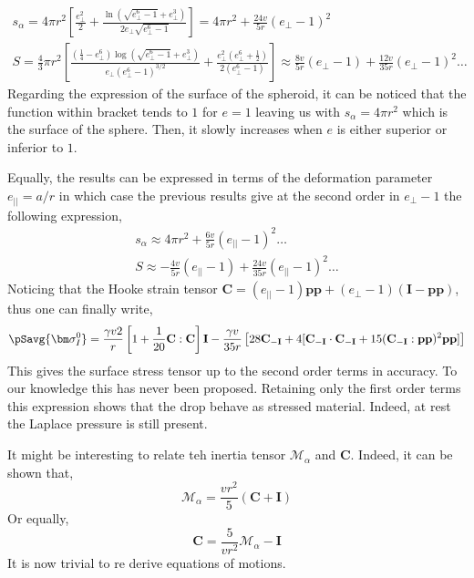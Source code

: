 \begin{align*}
    s_\alpha 
    = 4\pi r^2 \left[\frac{e_\bot^2}{2} + \frac{\ln\left(\sqrt{{e_\bot^6}-1}+{e_\bot^3}\right)}{2e_\bot\sqrt{e_\bot^6-1}}\right]
    = 4 \pi r^2 + \frac{24 v }{5 r} (e_\bot-1)^2\\
    S = \frac{4}{3} \pi r^2 \left[
    \frac{\left( \frac{1}{4} - e_\bot^6\right)  \log{\left( \sqrt{e_\bot^6-1}+{e_\bot^3}\right) } }
    { e_\bot  \left( e_\bot^6- 1\right)^{3/2} }
    +  \frac{e_\bot^2\left( e_\bot^6+  \frac{1}{2}\right)}{2\left( e_\bot^6- 1\right)}  \right]
    \approx 
    \frac{8 v}{5 r}(e_\bot-1) + \frac{12 v }{35r}(e_\bot-1)^2 \ldots
\end{align*}
Regarding the expression of the surface of the spheroid, it can be noticed that the function within bracket tends to $1$ for $e=1$ leaving us with $s_\alpha = 4\pi r^2$ which is the surface of the sphere. 
Then, it slowly increases when $e$ is either superior or inferior to $1$. 

Equally, the results can be expressed in terms of the deformation parameter $e_{||} = a/r$ in which case the previous results give at the second order in $e_\bot-1$ the following expression, 
\begin{align*}
    s_\alpha 
    \approx 4 \pi r^2 + \frac{6 v }{5 r} (e_{||}-1)^2 \ldots\\
    S 
    \approx 
    - \frac{4 v}{5 r}(e_{||}-1) + \frac{24 v }{35r}(e_{||}-1)^2 \ldots
\end{align*}
Noticing that the Hooke strain tensor $\textbf{C} = (e_{||}-1) \textbf{pp} + (e_\bot-1)(\textbf{I}- \textbf{pp})$, thus one can finally write,
\begin{align*}
    \pSavg{\bm\sigma_I^0}
    = \frac{\gamma v 2}{r} \left[
        1  + \frac{1}{20 }\textbf{C}:\textbf{C}\right] \textbf{I}
        - \frac{\gamma v}{35 r} \left[ 28 \textbf{C}_{-\textbf{I}}
        + 4[\textbf{C}_{-\textbf{I}}\cdot \textbf{C}_{-\textbf{I}} + 15 (\textbf{C}_{-\textbf{I}}:\textbf{pp})^2\textbf{pp}]
        \right]
\end{align*}
This gives the surface stress tensor up to the second order terms in accuracy. 
To our knowledge this has never been proposed. 
Retaining only the first order terms this expression shows that the drop behave as stressed material. 
Indeed, at rest the Laplace pressure is still present. 

It might be interesting to relate teh inertia tensor $\mathcal{M}_\alpha$ and \textbf{C}. 
Indeed, it can be shown that, 
\begin{equation}
    \mathcal{M}_\alpha
     = \frac{v r^2}{5}\left(\textbf{C} + \textbf{I}\right)
\end{equation}
Or equally, 
\begin{equation}
    \textbf{C}
     = \frac{5}{vr^2}\mathcal{M}_\alpha - \textbf{I}
\end{equation}
It is now trivial to re derive \citet{goddard1967nonlinear} equations of motions. 


